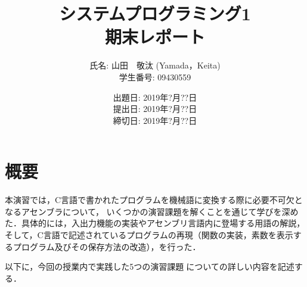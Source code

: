 \documentclass[a4j,11pt]{jarticle}
\title{システムプログラミング1 \\
       期末レポート}
\author{氏名: 山田　敬汰 (Yamada，Keita) \\
        学生番号: 09430559}
\date{出題日: 2019年?月??日 \\   %
      提出日: 2019年?月??日 \\
      締切日: 2019年?月??日 \\}  %
\begin{document}
\maketitle



\section{概要}


本演習では，C言語で書かれたプログラムを機械語に変換する際に必要不可欠となるアセンブラについて，
いくつかの演習課題を解くことを通じて学びを深めた．具体的には，入出力機能の実装やアセンブリ言語内に登場する用語の解説，
そして，C言語で記述されているプログラムの再現（関数の実装，素数を表示するプログラム及びその保存方法の改造），を行った．

以下に，今回の授業内で実践した5つの演習課題についての詳しい内容を記述する．



\end{document}
